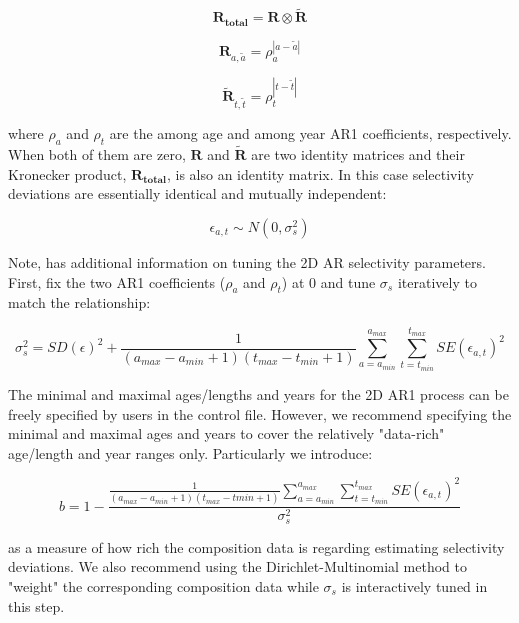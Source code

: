 \begin{equation}
\mathbf{R_{total}}=\mathbf{R}\otimes\mathbf{\tilde{R}}
\end{equation}

\begin{equation}
\mathbf{R}_{a,\tilde{a}}=\rho_a^{|a-\tilde{a}|}
\end{equation}

\begin{equation}
\mathbf{\tilde{R}}_{t,\tilde{t}}=\rho_t^{|t-\tilde{t}|}
\end{equation}

where $\rho_a$ and $\rho_t$ are the among age and among year AR1 coefficients, respectively. When both of them are zero, $\mathbf{R}$ and $\mathbf{\tilde{R}}$ are two identity matrices and their Kronecker product, $\mathbf{R_{total}}$, is also an identity matrix. In this case selectivity deviations are essentially identical and mutually independent:

\begin{equation}
\epsilon_{a,t}\sim N(0,\sigma_s^2)
\end{equation} 

Note, \citet{xu_new_2019} has additional information on tuning the 2D AR selectivity parameters. First, fix the two AR1 coefficients ($\rho_a$ and $\rho_t$) at 0 and tune $\sigma_s$ iteratively to match the relationship:

\begin{equation}
\sigma_s^2=SD(\epsilon)^2+\frac{1}{(a_{max}-a_{min}+1)(t_{max}-t_{min}+1)}\sum_{a=a_{min}}^{a_{max}}\sum_{t=t_{min}}^{t_{max}}SE(\epsilon_{a,t})^2
\end{equation}

The minimal and maximal ages/lengths and years for the 2D AR1 process can be freely specified by users in the control file. However, we recommend specifying the minimal and maximal ages and years to cover the relatively "data-rich" age/length and year ranges only. Particularly we introduce: 

\begin{equation}
b=1-\frac{\frac{1}{(a_{max}-a_{min}+1)(t_{max}-t{min}+1)}\sum_{a=a_{min}}^{a_{max}}\sum_{t=t_{min}}^{t_{max}}SE(\epsilon_{a,t})^2}{\sigma_s^2}
\end{equation}

as a measure of how rich the composition data is regarding estimating selectivity deviations. We also recommend using the Dirichlet-Multinomial method to "weight" the corresponding composition data while $\sigma_s$ is interactively tuned in this step.

